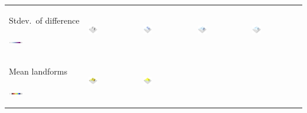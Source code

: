 \documentclass[prodmode,acmtochi]{acmsmall} %
\begin{document}
\begin{table}
{\begin{tabular}{m{} m{} m{} m{} m{}}
%
Stdev.~of difference \par \vspace{0.5em} \includegraphics[width=0.19\textwidth]{images/legends/stdev_diff_legend.pdf} & 
\includegraphics[width=0.19\textwidth]{images/render_3d/students/dem_difference_1.png} &
\includegraphics[width=0.19\textwidth]{images/render_3d/students/stdev_regression_difference_series_1.png} &
\includegraphics[width=0.19\textwidth]{images/render_3d/students/stdev_regression_difference_series_2.png} &
\includegraphics[width=0.19\textwidth]{images/render_3d/students/stdev_regression_difference_series_3.png}\\
%
Mean landforms \par \vspace{0.5em} \includegraphics[width=0.19\textwidth]{images/legends/forms_legend.pdf} & 
\includegraphics[width=0.19\textwidth]{images/render_3d/students/forms_1.png} &
\includegraphics[width=0.19\textwidth]{images/render_3d/students/mean_forms_1.png} &

\end{tabular}}
\end{table}
\end{document}
